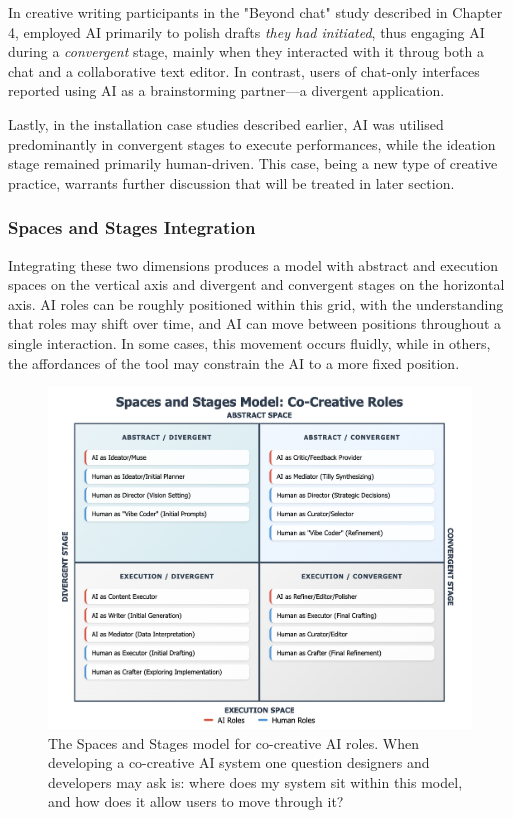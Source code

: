 In creative writing participants in the "Beyond chat" study described in Chapter 4, employed AI primarily to polish drafts \textit{they had initiated}, thus engaging AI during a \textit{convergent} stage, mainly when they interacted with it throug both a chat and a collaborative text editor. In contrast, users of chat-only interfaces reported using AI as a brainstorming partner—a divergent application. 

Lastly, in the installation case studies described earlier, AI was utilised predominantly in convergent stages to execute performances, while the ideation stage remained primarily human-driven. This case, being a new type of creative practice, warrants further discussion that will be treated in later section.

\subsubsection{Spaces and Stages Integration}

Integrating these two dimensions produces a model with abstract and execution spaces on the vertical axis and divergent and convergent stages on the horizontal axis. AI roles can be roughly positioned within this grid, with the understanding that roles may shift over time, and AI can move between positions throughout a single interaction. In some cases, this movement occurs fluidly, while in others, the affordances of the tool may constrain the AI to a more fixed position.

\begin{figure}
    \centering
    \includegraphics[width=1\linewidth]{spacesandstages.png}
    \caption{The Spaces and Stages model for co-creative AI roles. When developing a co-creative AI system one question designers and developers may ask is: where does my system sit within this model, and how does it allow users to move through it?}
    \label{fig:spacesandstages}
\end{figure}

